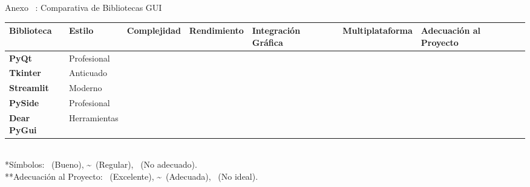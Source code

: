 \begin{frame}{Anexo \thesection~: Comparativa de Bibliotecas GUI}
    \centering
    \label{tab:gui-comparativa-beamer}
    \vspace{-0.1cm}
    \begin{adjustbox}{max width=\textwidth, max height=0.8\textheight, keepaspectratio}
        \renewcommand{\arraystretch}{1.1}
        \begin{tabular}{@{}p{3.5cm} >{\centering\arraybackslash}p{2.5cm} >{\centering\arraybackslash}p{2.5cm} >{\centering\arraybackslash}p{2.5cm} >{\centering\arraybackslash}p{2.5cm} >{\centering\arraybackslash}p{2.5cm} >{\centering\arraybackslash}p{2.5cm}@{}}
            \toprule
            \textbf{Biblioteca} & \textbf{Estilo} & \textbf{Complejidad} & \textbf{Rendimiento} & \textbf{Integración Gráfica} & \textbf{Multiplataforma} & \textbf{Adecuación al Proyecto} \\
            \midrule
            \rowcolor{yellow!25}
            \textbf{PyQt} & Profesional & \color{red!40!orange}{\textasciitilde} & \color{green}{\checkmark} & \color{green}{\checkmark} & \color{green}{\checkmark} & \color{green}{\checkmark} \\
            \midrule
            \textbf{Tkinter} & Anticuado & \color{green}{\checkmark} & \color{red!40!orange}{\textasciitilde} & \color{green}{\checkmark} & \color{green}{\checkmark} & \color{yellow}{\textasciitilde} \\
            \midrule
            \textbf{Streamlit} & Moderno & \color{green}{\checkmark} & \color{red!40!orange}{\textasciitilde} & \color{green}{\checkmark} & \color{red!40!orange}{\textasciitilde} & \color{red}{\xmark} \\
            \midrule
            \textbf{PySide} & Profesional & \color{red!40!orange}{\textasciitilde} & \color{green}{\checkmark} & \color{green}{\checkmark} & \color{green}{\checkmark} & \color{green}{\checkmark} \\
            \midrule
            \textbf{Dear PyGui} & Herramientas & \color{red!40!orange}{\textasciitilde} & \color{green}{\checkmark} & \color{red!40!orange}{\textasciitilde} & \color{green}{\checkmark} & \color{red}{\xmark} \\
            \bottomrule
        \end{tabular}
    \end{adjustbox}
    \smallskip
    \vspace{0cm}\\
    \tiny{*Símbolos: \checkmark~(Bueno), \textasciitilde~(Regular), \xmark~(No adecuado).}\\
    \tiny{**Adecuación al Proyecto: \checkmark~(Excelente), \textasciitilde~(Adecuada), \xmark~(No ideal).}
\end{frame}

